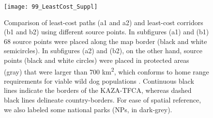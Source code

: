 \documentclass[abstract=off,10pt,a4paper,bibliography=totocnumbered]{article}
\begin{document}
\begin{figure}[hbtp]
  \begin{center}
  \texttt{[image: 99\_LeastCost\_Suppl]}
  \caption{Comparison of least-cost paths (a1 and a2) and least-cost corridors
  (b1 and b2) using different source points. In subfigures (a1) and (b1) 68
  source points were placed along the map border (black and white semicircles).
  In subfigures (a2) and (b2), on the other hand, source points (black and white
  circles) were placed in protected areas (gray) that were larger than 700
  km\textsuperscript{2}, which conforms to home range requirements for viable
  wild dog populations \citep{Pomilia.2015}. Continuous black lines indicate the
  borders of the KAZA-TFCA, whereas dashed black lines delineate
  country-borders. For ease of spatial reference, we also labeled some national
  parks (NPs, in dark-grey).}
  \label{AlternativeSourcePoints}
  \end{center}
\end{figure}

\newpage
\begingroup
\singlespacing

\endgroup
\end{document}
